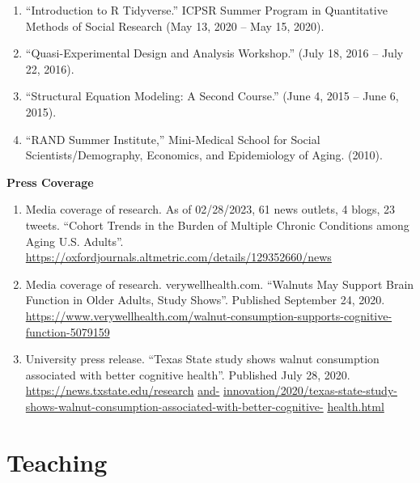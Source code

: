\documentclass[
]{article}
\begin{document}
\begin{enumerate}
\def\labelenumi{\arabic{enumi}.}
\item
  ``Introduction to R Tidyverse.'' ICPSR Summer Program in Quantitative
  Methods of Social Research (May 13, 2020 -- May 15, 2020).
\item
  ``Quasi-Experimental Design and Analysis Workshop.'' (July 18, 2016 --
  July 22, 2016).
\item
  ``Structural Equation Modeling: A Second Course.'' (June 4, 2015 --
  June 6, 2015).
\item
  ``RAND Summer Institute,'' Mini-Medical School for Social
  Scientists/Demography, Economics, and Epidemiology of Aging. (2010).
\end{enumerate}

\textbf{Press Coverage}

\begin{enumerate}
\def\labelenumi{\arabic{enumi}.}
\item
  Media coverage of research. As of 02/28/2023, 61 news outlets, 4
  blogs, 23 tweets. ``Cohort Trends in the Burden of Multiple Chronic
  Conditions among Aging U.S. Adults''.
  \url{https://oxfordjournals.altmetric.com/details/129352660/news}
\item
  Media coverage of research. verywellhealth.com. ``Walnuts May Support
  Brain Function in Older Adults, Study Shows''. Published September 24,
  2020.
  \url{https://www.verywellhealth.com/walnut-consumption-supports-cognitive-function-5079159}
\item
  University press release. ``Texas State study shows walnut consumption
  associated with better cognitive health''. Published July 28, 2020.
  \href{https://news.txstate.edu/research-and-innovation/2020/texas-state-study-shows-walnut-consumption-associated-with-better-cognitive-health.html}{https://news.txstate.edu/research}
  \href{https://news.txstate.edu/research-and-innovation/2020/texas-state-study-shows-walnut-consumption-associated-with-better-cognitive-health.html}{and-}
  \href{https://news.txstate.edu/research-and-innovation/2020/texas-state-study-shows-walnut-consumption-associated-with-better-cognitive-health.html}{innovation/2020/texas-state-study-shows-walnut-consumption-associated-with-better-cognitive-}
  \href{https://news.txstate.edu/research-and-innovation/2020/texas-state-study-shows-walnut-consumption-associated-with-better-cognitive-health.html}{health.html}
\end{enumerate}

\hypertarget{teaching}{%
\section{\texorpdfstring{\textbf{Teaching}}{Teaching}}\label{teaching}}
\end{document}

